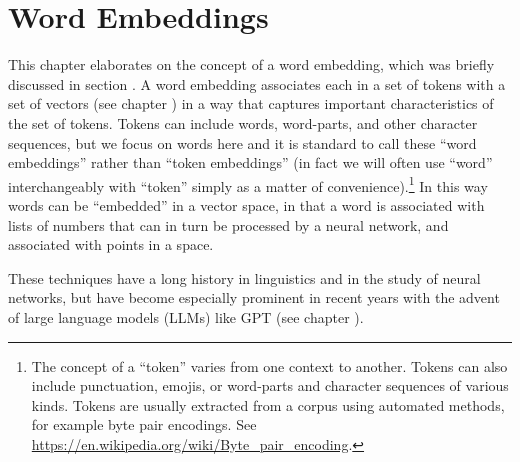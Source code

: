 \chapter{Word Embeddings}\label{ch_word_embeddings}


This chapter elaborates on the concept of a word embedding, which was briefly discussed in section . A word embedding associates each  in a set of tokens with a set of vectors (see chapter ) in a way that captures important characteristics of the set of tokens. Tokens can include words, word-parts, and other character sequences, but we focus on words here and it is standard to call these ``word embeddings'' rather than ``token embeddings'' (in fact we will often use ``word'' interchangeably with ``token'' simply as a matter of convenience).\footnote{The concept of a ``token'' varies from one context to another. Tokens can also include punctuation, emojis, or word-parts and character sequences of various kinds. Tokens are usually extracted from a corpus using automated methods, for example byte pair encodings. See \url{https://en.wikipedia.org/wiki/Byte_pair_encoding}.} In this way words can be ``embedded'' in a vector space, in that a word is associated with lists of numbers that can in turn be processed by a neural network, and associated with points in a space. 

These techniques have a long history in linguistics and in the study of neural networks, but have become especially prominent in recent years with the advent of large language models (LLMs) like GPT (see chapter ). 

